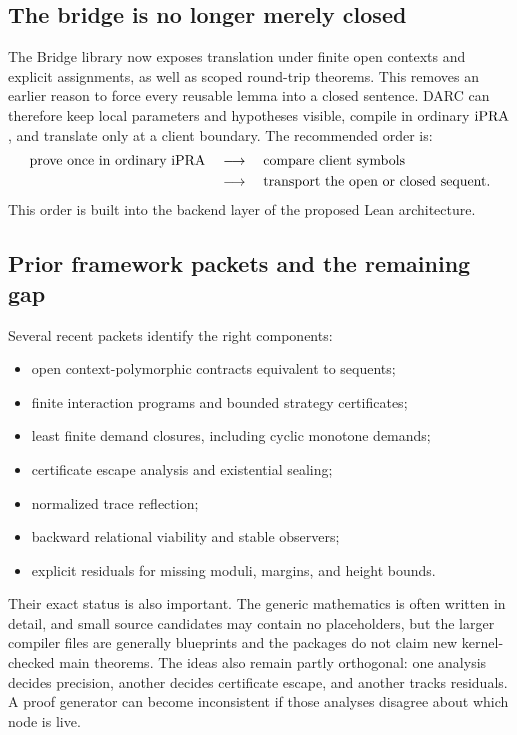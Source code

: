 \subsection{The bridge is no longer merely closed}

The Bridge library now exposes translation under finite open contexts and
explicit assignments, as well as scoped round-trip theorems.  This removes an
earlier reason to force every reusable lemma into a closed sentence.  DARC can
therefore keep local parameters and hypotheses visible, compile in ordinary
\(\mathrm{iPRA}\), and translate only at a client boundary.  The recommended order is:
\[
\begin{aligned}
  \text{prove once in ordinary }\mathrm{iPRA}
    &\quad\longrightarrow\quad \text{compare client symbols}\\
    &\quad\longrightarrow\quad \text{transport the open or closed sequent}.
\end{aligned}
\]
This order is built into the backend layer of the proposed Lean architecture.

\subsection{Prior framework packets and the remaining gap}

Several recent packets identify the right components:
\begin{itemize}
  \item open context-polymorphic contracts equivalent to sequents;
  \item finite interaction programs and bounded strategy certificates;
  \item least finite demand closures, including cyclic monotone demands;
  \item certificate escape analysis and existential sealing;
  \item normalized trace reflection;
  \item backward relational viability and stable observers;
  \item explicit residuals for missing moduli, margins, and height bounds.
\end{itemize}
Their exact status is also important.  The generic mathematics is often
written in detail, and small source candidates may contain no placeholders,
but the larger compiler files are generally blueprints and the packages do not
claim new kernel-checked main theorems.  The ideas also remain partly
orthogonal: one analysis decides precision, another decides certificate
escape, and another tracks residuals.  A proof generator can become
inconsistent if those analyses disagree about which node is live.

